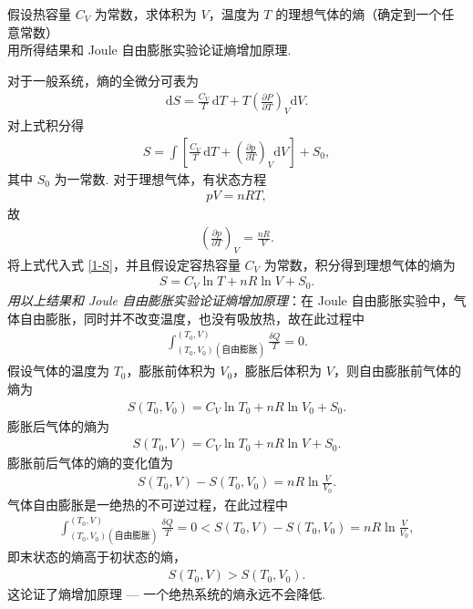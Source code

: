 \documentclass{assignment}
\begin{document}
\begin{prob}
    假设热容量 $C_V$ 为常数，求体积为 $V$，温度为 $T$ 的理想气体的熵（确定到一个任意常数）\\
    用所得结果和 Joule 自由膨胀实验论证熵增加原理.
\end{prob}
\begin{sol}
    对于一般系统，熵的全微分可表为
    \begin{align}
        \mathrm{d}S=\frac{C_V}{T}\,\mathrm{d}T+T\left(\frac{\partial P}{\partial T}\right)_V\mathrm{d}V.
    \end{align}
    对上式积分得
    \begin{align}
        \label{1-S}
        S=\int\left[\frac{C_V}{T}\,\mathrm{d}T+\left(\frac{\partial p}{\partial T}\right)_V\mathrm{d}V\right]+S_0,
    \end{align}
    其中 $S_0$ 为一常数.
    对于理想气体，有状态方程
    \begin{align}
        pV=nRT,
    \end{align}
    故
    \begin{align}
        \left(\frac{\partial p}{\partial T}\right)_V=\frac{nR}{V}.
    \end{align}
    将上式代入式 \eqref{1-S}，并且假设定容热容量 $C_V$ 为常数，积分得到理想气体的熵为
    \begin{align}
        S=C_V\ln T+nR\ln V+S_0.
    \end{align}
    \emph{用以上结果和 Joule 自由膨胀实验论证熵增加原理}：在 Joule 自由膨胀实验中，气体自由膨胀，同时并不改变温度，也没有吸放热，故在此过程中
    \begin{align}
        \int_{(T_0,V_0)(\text{自由膨胀})}^{(T_0,V)}\frac{\delta Q}{T}=0.
    \end{align}
    假设气体的温度为 $T_0$，膨胀前体积为 $V_0$，膨胀后体积为 $V$，则自由膨胀前气体的熵为
    \begin{align}
        S(T_0,V_0)=C_V\ln T_0+nR\ln V_0+S_0.
    \end{align}
    膨胀后气体的熵为
    \begin{align}
        S(T_0,V)=C_V\ln T_0+nR\ln V+S_0.
    \end{align}
    膨胀前后气体的熵的变化值为
    \begin{align}
        S(T_0,V)-S(T_0,V_0)=nR\ln\frac{V}{V_0}.
    \end{align}
    气体自由膨胀是一绝热的不可逆过程，在此过程中
    \begin{align}
        \int_{(T_0,V_0)(\text{自由膨胀})}^{(T_0,V)}\frac{\delta Q}{T}=0<S(T_0,V)-S(T_0,V_0)=nR\ln\frac{V}{V_0},
    \end{align}
    即末状态的熵高于初状态的熵，
    \begin{align}
        S(T_0,V)>S(T_0,V_0).
    \end{align}
    这论证了熵增加原理 --- 一个绝热系统的熵永远不会降低.
\end{sol}
\end{document}
